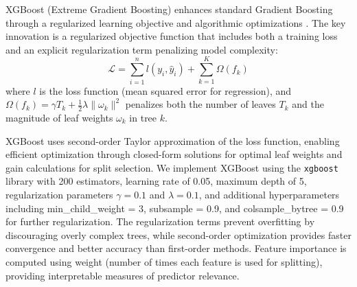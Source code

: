 \documentclass[10pt,twocolumn]{article}
\begin{document}
\par XGBoost (Extreme Gradient Boosting) enhances standard Gradient Boosting through a regularized learning objective and algorithmic optimizations \cite{chen2016xgboost}. The key innovation is a regularized objective function that includes both a training loss and an explicit regularization term penalizing model complexity:
\begin{equation}
\mathcal{L} = \sum_{i=1}^{n} l(y_i, \hat{y}_i) + \sum_{k=1}^{K} \Omega(f_k)
\end{equation}
where $l$ is the loss function (mean squared error for regression), and $\Omega(f_k) = \gamma T_k + \frac{1}{2}\lambda \|\omega_k\|^2$ penalizes both the number of leaves $T_k$ and the magnitude of leaf weights $\omega_k$ in tree $k$.
\par XGBoost uses second-order Taylor approximation of the loss function, enabling efficient optimization through closed-form solutions for optimal leaf weights and gain calculations for split selection. We implement XGBoost using the \texttt{xgboost} library with 200 estimators, learning rate of 0.05, maximum depth of 5, regularization parameters $\gamma = 0.1$ and $\lambda = 0.1$, and additional hyperparameters including min\_child\_weight = 3, subsample = 0.9, and colsample\_bytree = 0.9 for further regularization. The regularization terms prevent overfitting by discouraging overly complex trees, while second-order optimization provides faster convergence and better accuracy than first-order methods. Feature importance is computed using weight (number of times each feature is used for splitting), providing interpretable measures of predictor relevance.
\end{document}
